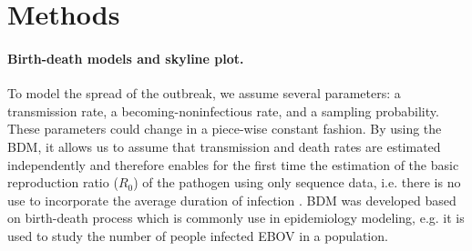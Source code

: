 \documentclass[11pt]{paper}
\begin{document}
\section*{Methods}

\paragraph{Birth-death models and skyline plot.}
	To model the spread of the outbreak, we assume several parameters: a transmission rate, a becoming-noninfectious rate, and a sampling probability. 
	These parameters could change in a piece-wise constant fashion. 
	By using the BDM, it allows us to assume that transmission and death rates are estimated independently and therefore enables for the first time the estimation of the basic reproduction ratio ($R_0$) of the pathogen using only sequence data, i.e. there is no use to incorporate the average duration of infection \cite{Stadler2012}.
	BDM was developed based on birth-death process which is commonly use in epidemiology modeling, e.g. it is used to study the number of people infected EBOV in a population. 
	
\end{document}
